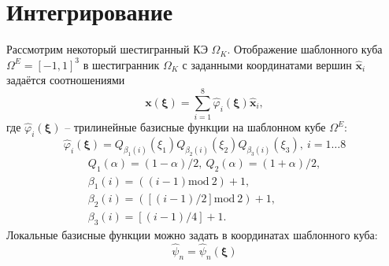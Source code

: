 \section{Интегрирование}
Рассмотрим некоторый шестигранный КЭ $\Omega_K$. Отображение шаблонного куба $\Omega^E=[-1,1]^3$ в шестигранник $\Omega_K$ с заданными координатами вершин $\hat{\mathbf{x}}_i$ задаётся соотношениями
\begin{equation}
\mathbf{x}\left(\bm{\xi}\right)=\sum_{i=1}^{8}\hat{\varphi}_i\left(\bm{\xi}\right)\hat{\mathbf{x}}_i,
\label{F:F_mapping}
\end{equation}
где $\hat{\varphi}_i\left(\bm{\xi}\right)$ -- трилинейные базисные функции на шаблонном кубе  $\Omega^E$:
\begin{equation}
\hat{\varphi}_i\left(\bm{\xi}\right)=
Q_{\beta_1(i)}\left(\xi_1\right)
Q_{\beta_2(i)}\left(\xi_2\right)
Q_{\beta_3(i)}\left(\xi_3\right),
\: i=1\ldots 8
\label{F:F_mapping_linear1}
\end{equation}
\begin{equation}
\begin{gathered}
Q_1\left(\alpha\right)=\left(1-\alpha\right)/2, \: 
Q_2\left(\alpha\right)=\left(1+\alpha\right)/2, \\
\beta_1(i)=\left(\left(i-1\right) \mathrm{mod} \: 2\right)+1, \\
\beta_2(i)=\left(\left[\left(i-1\right)/2\right] \mathrm{mod} \: 2\right)+1, \\
\beta_3(i)=\left[\left(i-1\right)/4\right]+1.
\end{gathered}
\label{F:F_mapping_linear2}
\end{equation}
Локальные базисные функции можно задать в координатах шаблонного куба:
\begin{equation}
\hat{\psi}_{n}=\hat{\psi}_{n}\left(\bm{\xi}\right)
\label{F:F_mapping_linear3}
\end{equation}

